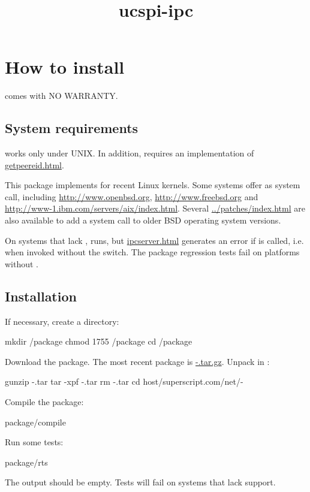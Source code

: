 \documentclass{book}
\title{ucspi-ipc}
\begin{document}
\section{How to install \package}

\package{} comes with NO WARRANTY.

\subsection{System requirements}
\package{} works only under UNIX.  In addition, \package{} requires
an implementation of \href{\cmd{getpeereid}}{getpeereid.html}.

This package implements  for recent Linux kernels.
Some systems offer  as system call, including
\href{OpenBSD~3.0}{http://www.openbsd.org},
\href{FreeBSD~4.6}{http://www.freebsd.org} and
\href{AIX~5L}{http://www-1.ibm.com/servers/aix/index.html}.
Several \href{patches}{../patches/index.html} are also available to add
a  system call to older BSD operating system versions.

On systems that lack , \package{} runs, but
\href{\cmd{ipcserver}}{ipcserver.html} generates an error if 
is called, i.e. when invoked without the  switch.  The package
regression tests fail on platforms without .

\subsection{Installation}
If necessary, create a  directory:
\begin{code}%
  mkdir /package
  chmod 1755 /package
  cd /package
\end{code}

Download the \package{} package.  The most recent \package{} package is
\href{\package~\version}{\package-\version.tar.gz}.  Unpack \package{} in
:
\begin{code}%
  gunzip \package-\version.tar
  tar -xpf \package-\version.tar
  rm \package-\version.tar
  cd host/superscript.com/net/\package-\version
\end{code}

Compile the package:
\begin{code}%
  package/compile
\end{code}

Run some tests:
\begin{code}%
  package/rts
\end{code}
The output should be empty.  Tests will fail on systems that lack
 support.
\end{document}
